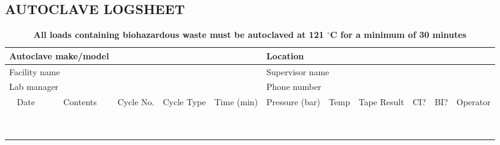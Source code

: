 \documentclass{sop_class}[overrideChapters] %
\begin{document}
{\begin{landscape}
\section{AUTOCLAVE LOGSHEET}\label{autoclave-logheet}
\begin{table}[!htbp]
    \centering
    \setlength{\tabcolsep}{0.5em}
      \begin{threeparttable}
      \captionsetup{justification=centering}
        \caption*{\textbf{All loads containing biohazardous waste must be autoclaved at 121 $^{\circ}$C for a minimum of 30 minutes}}
              \begin{tabular}{|c|c|c|c|c|c|c|c|c|c|c|}
            \toprule
            \hline
            \multicolumn{2}{|l|}{Autoclave make/model} & \multicolumn{3}{|l|}{} & \multicolumn{2}{|l|}{Location} & \multicolumn{4}{|l|}{}\\
            \hline
            \multicolumn{2}{|l|}{Facility name} & \multicolumn{3}{|l|}{} & \multicolumn{2}{|l|}{Supervisor name} & \multicolumn{4}{|l|}{}\\
            \hline
            \multicolumn{2}{|l|}{Lab manager} & \multicolumn{3}{|l|}{} & \multicolumn{2}{|l|}{Phone number} & \multicolumn{4}{|l|}{}\\
            \hline
            {Date} & {Contents} & {Cycle No.} & {Cycle Type} & {Time (min)} & {Pressure (bar)} & {Temp} & {Tape Result} & {CI?} & {BI?} & {Operator}\\
            \hline
            {} & {} & {} & {} & {} & {} & {} & {} & {} & {} & {}\\
            \hline
            {} & {} & {} & {} & {} & {} & {} & {} & {} & {} & {}\\
            \hline
            {} & {} & {} & {} & {} & {} & {} & {} & {} & {} & {}\\
            \hline
            {} & {} & {} & {} & {} & {} & {} & {} & {} & {} & {}\\
            \hline
            {} & {} & {} & {} & {} & {} & {} & {} & {} & {} & {}\\
            \hline
            {} & {} & {} & {} & {} & {} & {} & {} & {} & {} & {}\\
            \hline
            {} & {} & {} & {} & {} & {} & {} & {} & {} & {} & {}\\
            \hline
            {} & {} & {} & {} & {} & {} & {} & {} & {} & {} & {}\\
            \hline
            {} & {} & {} & {} & {} & {} & {} & {} & {} & {} & {}\\

\end{tabular}
\end{threeparttable}
\end{table}
\end{landscape}}
\end{document}
